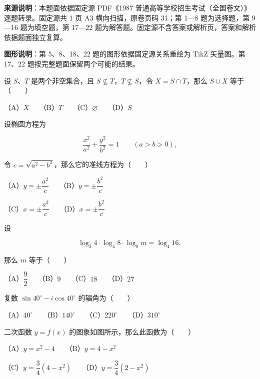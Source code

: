 


\begin{gktip}
\textbf{来源说明}：本题面依据固定源 PDF《1987 普通高等学校招生考试（全国卷文）》逐题转录。固定源共 1 页 A3 横向扫描，原卷页码 31；第 1—8 题为选择题，第 9—16 题为填空题，第 17—22 题为解答题。固定源不含答案或解析页，答案和解析依据题面独立复算。

\textbf{图形说明}：第 5、8、18、22 题的图形依据固定源关系重绘为 TikZ 矢量图。第 17、22 题按完整题面保留两个可能的结果。
\end{gktip}

\begin{question}
设 $S\text{、}T$ 是两个非空集合，且 $S\nsubseteq T$，$T\nsubseteq S$，令 $X=S\cap T$，那么 $S\cup X$ 等于\mbox{（　　）}

（A）$X$　　（B）$T$　　（C）$\varnothing$　　（D）$S$

\end{question}
\begin{question}
设椭圆方程为

\nopagebreak[4]
\[
\frac{x^2}{a^2}+\frac{y^2}{b^2}=1\qquad(a>b>0),
\]

令 $c=\sqrt{a^2-b^2}$，那么它的准线方程为\mbox{（　　）}

（A）$y=\pm\dfrac{a^2}{c}$　　（B）$y=\pm\dfrac{b^2}{c}$

（C）$x=\pm\dfrac{a^2}{c}$　　（D）$x=\pm\dfrac{b^2}{c}$

\end{question}
\begin{question}
设

\nopagebreak[4]
\[
\log_3 4\cdot\log_4 8\cdot\log_8m=\log_4 16,
\]

那么 $m$ 等于\mbox{（　　）}

（A）$\dfrac92$　　（B）$9$　　（C）$18$　　（D）$27$

\end{question}
\begin{question}
复数 $\sin40^\circ-i\cos40^\circ$ 的辐角为\mbox{（　　）}

（A）$40^\circ$　　（B）$140^\circ$　　（C）$220^\circ$　　（D）$310^\circ$

\Needspace{0.4\textheight}
\end{question}
\begin{question}
二次函数 $y=f(x)$ 的图象如图所示，那么此函数为\mbox{（　　）}
\nopagebreak[4]
\begin{center}\end{center}
\nopagebreak[4]
（A）$y=x^2-4$　　（B）$y=4-x^2$

（C）$y=\dfrac34(4-x^2)$　　（D）$y=\dfrac34(2-x^2)$

\end{question}
